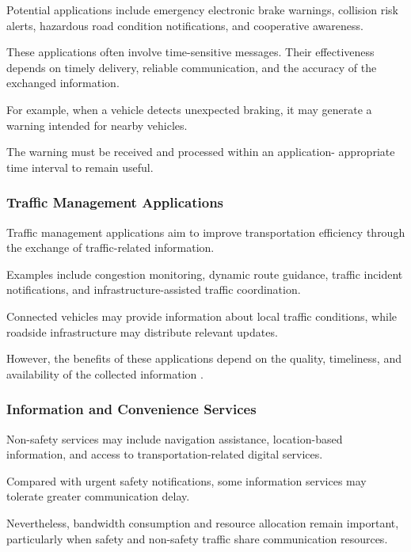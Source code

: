 Potential applications
include emergency
electronic brake warnings,
collision risk alerts,
hazardous road condition
notifications, and
cooperative awareness.

These applications
often involve
time-sensitive messages.
Their effectiveness
depends on timely
delivery, reliable
communication, and
the accuracy of
the exchanged information.

For example, when a
vehicle detects
unexpected braking,
it may generate
a warning intended
for nearby vehicles.

The warning must be
received and processed
within an application-
appropriate time
interval to remain useful.

\subsubsection{Traffic Management Applications}

Traffic management
applications aim to
improve transportation
efficiency through
the exchange of
traffic-related information.

Examples include
congestion monitoring,
dynamic route guidance,
traffic incident
notifications, and
infrastructure-assisted
traffic coordination.

Connected vehicles
may provide information
about local traffic
conditions, while
roadside infrastructure
may distribute
relevant updates.

However, the benefits
of these applications
depend on the quality,
timeliness, and
availability of
the collected information
\cite{Karagiannis2011}.

\subsubsection{Information and Convenience Services}

Non-safety services
may include navigation
assistance, location-based
information, and access
to transportation-related
digital services.

Compared with urgent
safety notifications,
some information services
may tolerate greater
communication delay.

Nevertheless, bandwidth
consumption and
resource allocation
remain important,
particularly when
safety and non-safety
traffic share
communication resources.

